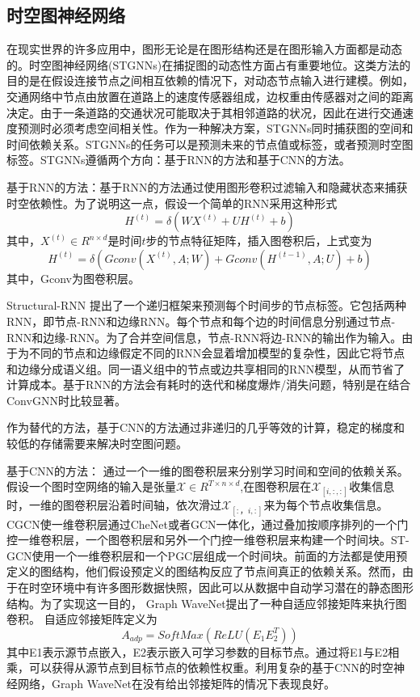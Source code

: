 \subsection{时空图神经网络}
在现实世界的许多应用中，图形无论是在图形结构还是在图形输入方面都是动态的。时空图神经网络(STGNNs)在捕捉图的动态性方面占有重要地位。这类方法的目的是在假设连接节点之间相互依赖的情况下，对动态节点输入进行建模。例如，交通网络中节点由放置在道路上的速度传感器组成，边权重由传感器对之间的距离决定。由于一条道路的交通状况可能取决于其相邻道路的状况，因此在进行交通速度预测时必须考虑空间相关性。作为一种解决方案，STGNNs同时捕获图的空间和时间依赖关系。STGNNs的任务可以是预测未来的节点值或标签，或者预测时空图标签。STGNNs遵循两个方向：基于RNN的方法和基于CNN的方法。

基于RNN的方法：基于RNN的方法通过使用图形卷积过滤输入和隐藏状态来捕获时空依赖性。为了说明这一点，假设一个简单的RNN采用这种形式
\[
H^{(t)}=\delta(WX^{(t)}+UH^{(t)}+b)
\]
其中，$X^{(t)}\in R^{n\times d}$是时间$t$步的节点特征矩阵，插入图卷积后，上式变为
\[
H^{(t)}=\delta(Gconv(X^{(t)},A;W)+Gconv(H^{(t-1)},A;U)+b)
\]
其中，Gconv为图卷积层。

Structural-RNN \cite{jain2016structural}提出了一个递归框架来预测每个时间步的节点标签。它包括两种RNN，即节点-RNN和边缘RNN。每个节点和每个边的时间信息分别通过节点-RNN和边缘-RNN。为了合并空间信息，节点-RNN将边-RNN的输出作为输入。由于为不同的节点和边缘假定不同的RNN会显着增加模型的复杂性，因此它将节点和边缘分成语义组。同一语义组中的节点或边共享相同的RNN模型，从而节省了计算成本。基于RNN的方法会有耗时的迭代和梯度爆炸/消失问题，特别是在结合ConvGNN时比较显著。

作为替代的方法，基于CNN的方法通过非递归的几乎等效的计算，稳定的梯度和较低的存储需要来解决时空图问题。

基于CNN的方法：
通过一个一维的图卷积层来分别学习时间和空间的依赖关系。假设一个图时空网络的输入是张量$\mathcal{X}\in R^{T \times n \times d}$,在图卷积层在$\mathcal{X}_{[i,:,:]}$收集信息时，一维的图卷积层沿着时间轴，依次滑过$\mathcal{X}_{[:，i,:]}$来为每个节点收集信息。CGCN使一维卷积层通过CheNet或者GCN一体化，通过叠加按顺序排列的一个门控一维卷积层，一个图卷积层和另外一个门控一维卷积层来构建一个时间块。ST-GCN使用一个一维卷积层和一个PGC层组成一个时间块。前面的方法都是使用预定义的图结构，他们假设预定义的图结构反应了节点间真正的依赖关系。然而，由于在时空环境中有许多图形数据快照，因此可以从数据中自动学习潜在的静态图形结构。为了实现这一目的，
Graph WaveNet\cite{wu2019graph}提出了一种自适应邻接矩阵来执行图卷积。
自适应邻接矩阵定义为
\[
A_{adp}=SoftMax(ReLU(E_1E_2^T))
\]
其中E1表示源节点嵌入，E2表示嵌入可学习参数的目标节点。通过将E1与E2相乘，可以获得从源节点到目标节点的依赖性权重。利用复杂的基于CNN的时空神经网络，Graph WaveNet在没有给出邻接矩阵的情况下表现良好。

